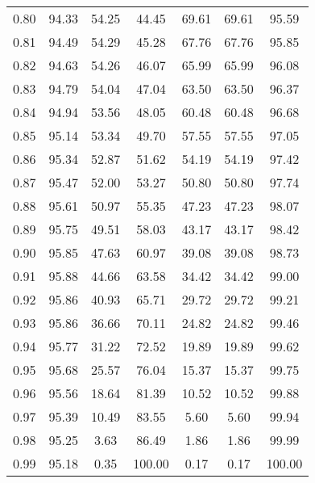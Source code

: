 \begin{tabular}{|c|c|c|c|c|c|c|}
      0.80 &     94.33 &     54.25 &      44.45 &   69.61 &      69.61 &         95.59 \\
      0.81 &     94.49 &     54.29 &      45.28 &   67.76 &      67.76 &         95.85 \\
      0.82 &     94.63 &     54.26 &      46.07 &   65.99 &      65.99 &         96.08 \\
      0.83 &     94.79 &     54.04 &      47.04 &   63.50 &      63.50 &         96.37 \\
      0.84 &     94.94 &     53.56 &      48.05 &   60.48 &      60.48 &         96.68 \\
      0.85 &     95.14 &     53.34 &      49.70 &   57.55 &      57.55 &         97.05 \\
      0.86 &     95.34 &     52.87 &      51.62 &   54.19 &      54.19 &         97.42 \\
      0.87 &     95.47 &     52.00 &      53.27 &   50.80 &      50.80 &         97.74 \\
      0.88 &     95.61 &     50.97 &      55.35 &   47.23 &      47.23 &         98.07 \\
      0.89 &     95.75 &     49.51 &      58.03 &   43.17 &      43.17 &         98.42 \\
      0.90 &     95.85 &     47.63 &      60.97 &   39.08 &      39.08 &         98.73 \\
      0.91 &     95.88 &     44.66 &      63.58 &   34.42 &      34.42 &         99.00 \\
      0.92 &     95.86 &     40.93 &      65.71 &   29.72 &      29.72 &         99.21 \\
      0.93 &     95.86 &     36.66 &      70.11 &   24.82 &      24.82 &         99.46 \\
      0.94 &     95.77 &     31.22 &      72.52 &   19.89 &      19.89 &         99.62 \\
      0.95 &     95.68 &     25.57 &      76.04 &   15.37 &      15.37 &         99.75 \\
      0.96 &     95.56 &     18.64 &      81.39 &   10.52 &      10.52 &         99.88 \\
      0.97 &     95.39 &     10.49 &      83.55 &    5.60 &       5.60 &         99.94 \\
      0.98 &     95.25 &      3.63 &      86.49 &    1.86 &       1.86 &         99.99 \\
      0.99 &     95.18 &      0.35 &     100.00 &    0.17 &       0.17 &        100.00 \\
\bottomrule
\end{tabular}
